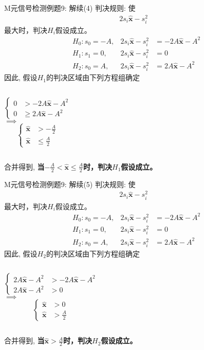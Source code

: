 \begin{frame}[shrink]{M元信号检测例题9: 解续(4)}
判决规则: 使
\begin{align*}
2s_i\bm{\hat{x}}-s_i^2
\end{align*}
最大时，判决$H_i$假设成立。
\begin{align*}
&H_0: s_0=-A, &2s_i\bm{\hat{x}}-s_i^2&=-2A\bm{\hat{x}}-A^2\\
&H_1: s_1=0, &2s_i\bm{\hat{x}}-s_i^2&=0\\
&H_2: s_0=A, &2s_i\bm{\hat{x}}-s_i^2&=2A\bm{\hat{x}}-A^2
\end{align*}
因此, 假设$H_1$的判决区域由下列方程组确定
\begin{columns}
	$$
	\begin{cases}
	0&> -2A\bm{\hat{x}}-A^2\\
	0&\ge 2A\bm{\hat{x}}-A^2
	\end{cases}
	$$
	$\implies$
	$$
	\begin{cases}
	\bm{\hat{x}}&> -\frac{A}{2}\\
	\bm{\hat{x}}&\le \frac{A}{2}
	\end{cases}
	$$
\end{columns}
合并得到, \textbf{当$-\frac{A}{2}<\bm{\hat{x}}\le \frac{A}{2}$时，判决$H_1$假设成立。}
\end{frame}

\begin{frame}[shrink]{M元信号检测例题9: 解续(5)}
判决规则: 使
\begin{align*}
2s_i\bm{\hat{x}}-s_i^2
\end{align*}
最大时，判决$H_i$假设成立。
\begin{align*}
&H_0: s_0=-A, &2s_i\bm{\hat{x}}-s_i^2&=-2A\bm{\hat{x}}-A^2\\
&H_1: s_1=0, &2s_i\bm{\hat{x}}-s_i^2&=0\\
&H_2: s_0=A, &2s_i\bm{\hat{x}}-s_i^2&=2A\bm{\hat{x}}-A^2
\end{align*}
因此, 假设$H_2$的判决区域由下列方程组确定
\begin{columns}
	$$
	\begin{cases}
	2A\bm{\hat{x}}-A^2 &> -2A\bm{\hat{x}}-A^2\\
	2A\bm{\hat{x}}-A^2 &> 0
	\end{cases}
	$$
	$\implies$
	$$
	\begin{cases}
	\bm{\hat{x}}&> 0\\
	\bm{\hat{x}}&> \frac{A}{2}
	\end{cases}
	$$
\end{columns}
合并得到, \textbf{当$\bm{\hat{x}}>\frac{A}{2}$时，判决$H_2$假设成立。}
\end{frame}